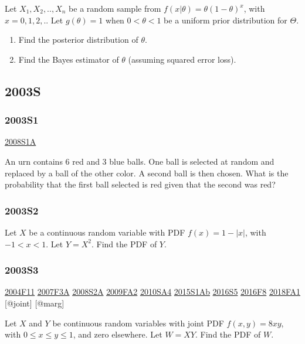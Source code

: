 \documentclass[6pt,Portrait]{article}
\begin{document}
Let \(X_1,X_2,..,X_n\) be a random sample from
\(f(x|\theta)=\theta(1-\theta)^x\), with \(x=0,1,2,..\) Let
\(g(\theta)=1\) when \(0<\theta<1\) be a uniform prior distribution for
\(\Theta\).

\begin{enumerate}
\def\labelenumi{\Alph{enumi})}
\item
  Find the posterior distribution of \(\theta\).
\item
  Find the Bayes estimator of \(\theta\) (assuming squared error loss).
\end{enumerate}

\hypertarget{s}{%
\subsection{2003S}\label{s}}

\hypertarget{s1}{%
\subsubsection{2003S1}\label{s1}}

\protect\hyperlink{s1a}{2008S1A}

An urn contains 6 red and 3 blue balls. One ball is selected at random
and replaced by a ball of the other color. A second ball is then chosen.
What is the probability that the first ball selected is red given that
the second was red?

\hypertarget{s2}{%
\subsubsection{2003S2}\label{s2}}

Let \(X\) be a continuous random variable with PDF \(f(x)=1-|x|\), with
\(-1<x<1\). Let \(Y=X^2\). Find the PDF of \(Y\).

\hypertarget{s3}{%
\subsubsection{2003S3}\label{s3}}

\protect\hyperlink{f11}{2004F11} \protect\hyperlink{f3a}{2007F3A}
\protect\hyperlink{s2a}{2008S2A} \protect\hyperlink{fa2}{2009FA2}
\protect\hyperlink{sa4-1}{2010SA4} \protect\hyperlink{s1ab}{2015S1Ab}
\protect\hyperlink{s5-4}{2016S5} \protect\hyperlink{f8-4}{2016F8}
\protect\hyperlink{fa1-4}{2018FA1} {[}@joint{]} {[}@marg{]}

Let \(X\) and \(Y\) be continuous random variables with joint PDF
\(f(x,y)=8xy\), with \(0\le x\le y\le1\), and zero elsewhere. Let
\(W=XY\). Find the PDF of \(W\).
\end{document}
